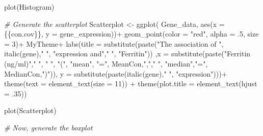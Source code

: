 \documentclass[
]{article}
\newenvironment{Shaded}{\begin{snugshade}}{\end{snugshade}}
\newcommand{\AttributeTok}[1]{\textcolor[rgb]{0.77,0.63,0.00}{#1}}
\newcommand{\CommentTok}[1]{\textcolor[rgb]{0.56,0.35,0.01}{\textit{#1}}}
\newcommand{\DecValTok}[1]{\textcolor[rgb]{0.00,0.00,0.81}{#1}}
\newcommand{\FunctionTok}[1]{\textcolor[rgb]{0.00,0.00,0.00}{#1}}
\newcommand{\NormalTok}[1]{#1}
\newcommand{\OtherTok}[1]{\textcolor[rgb]{0.56,0.35,0.01}{#1}}
\newcommand{\SpecialCharTok}[1]{\textcolor[rgb]{0.00,0.00,0.00}{#1}}
\newcommand{\StringTok}[1]{\textcolor[rgb]{0.31,0.60,0.02}{#1}}
\begin{document}
\begin{Shaded}
\begin{Highlighting}[]
\FunctionTok{plot}\NormalTok{(Histogram)}

\CommentTok{\# Generate the scatterplot}
\NormalTok{Scatterplot }\OtherTok{\textless{}{-}} \FunctionTok{ggplot}\NormalTok{( Gene\_data, }\FunctionTok{aes}\NormalTok{(}\AttributeTok{x =}\NormalTok{ \{\{con.cov\}\}, }\AttributeTok{y =}\NormalTok{ gene\_expression))}\SpecialCharTok{+}
  \FunctionTok{geom\_point}\NormalTok{(}\AttributeTok{color =} \StringTok{"red"}\NormalTok{, }\AttributeTok{alpha =}\NormalTok{ .}\DecValTok{5}\NormalTok{, }\AttributeTok{size =} \DecValTok{3}\NormalTok{)}\SpecialCharTok{+}
\NormalTok{  MyTheme}\SpecialCharTok{+}
  \FunctionTok{labs}\NormalTok{(}\AttributeTok{title =} \FunctionTok{substitute}\NormalTok{(}\FunctionTok{paste}\NormalTok{(}\StringTok{"The association of "}\NormalTok{, }\FunctionTok{italic}\NormalTok{(gene),}\StringTok{" "}\NormalTok{, }\StringTok{"expression and"}\NormalTok{,}\StringTok{" "}\NormalTok{, }\StringTok{"Ferritin"}\NormalTok{)) ,}\AttributeTok{x =} \FunctionTok{substitute}\NormalTok{(}\FunctionTok{paste}\NormalTok{(}\StringTok{"Ferritin (ng/ml)"}\NormalTok{,}\StringTok{" "}\NormalTok{, }\StringTok{" "}\NormalTok{, }\StringTok{"("}\NormalTok{, }\StringTok{"mean"}\NormalTok{, }\StringTok{"="}\NormalTok{, MeanCon,}\StringTok{","}\NormalTok{,}\StringTok{" "}\NormalTok{, }\StringTok{"median"}\NormalTok{,}\StringTok{"="}\NormalTok{, MedianCon,}\StringTok{")"}\NormalTok{)), }\AttributeTok{y =} \FunctionTok{substitute}\NormalTok{(}\FunctionTok{paste}\NormalTok{(}\FunctionTok{italic}\NormalTok{(gene),}\StringTok{" "}\NormalTok{, }\StringTok{"expression"}\NormalTok{)))}\SpecialCharTok{+}
  \FunctionTok{theme}\NormalTok{(}\AttributeTok{text =} \FunctionTok{element\_text}\NormalTok{(}\AttributeTok{size =} \DecValTok{11}\NormalTok{)) }\SpecialCharTok{+} 
  \FunctionTok{theme}\NormalTok{(}\AttributeTok{plot.title =} \FunctionTok{element\_text}\NormalTok{(}\AttributeTok{hjust =}\NormalTok{ .}\DecValTok{35}\NormalTok{))}

\FunctionTok{plot}\NormalTok{(Scatterplot)}

\CommentTok{\# Now, generate the boxplot}


\end{Highlighting}
\end{Shaded}
\end{document}
